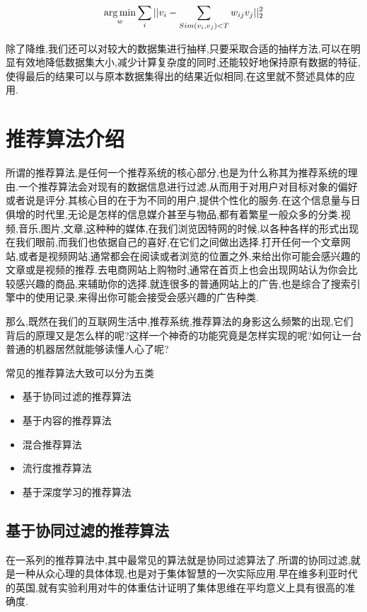 \begin{equation}
	\operatorname*{arg\,min}_{w} \sum_i ||v_i-\sum_{Sim(v_i,v_j)<T}w_{ij}v_j||^2_2
\end{equation}

除了降维,我们还可以对较大的数据集进行抽样,只要采取合适的抽样方法,可以在明显有效地降低数据集大小,减少计算复杂度的同时,还能较好地保持原有数据的特征,使得最后的结果可以与原本数据集得出的结果近似相同,在这里就不赘述具体的应用.

\section{推荐算法介绍}
\label{sec:recomm}

所谓的推荐算法,是任何一个推荐系统的核心部分,也是为什么称其为推荐系统的理由.一个推荐算法会对现有的数据信息进行过滤,从而用于对用户对目标对象的偏好或者说是评分.其核心目的在于为不同的用户,提供个性化的服务.在这个信息量与日俱增的时代里,无论是怎样的信息媒介甚至与物品,都有着繁星一般众多的分类.视频,音乐,图片,文章,这种种的媒体,在我们浏览因特网的时候,以各种各样的形式出现在我们眼前,而我们也依据自己的喜好,在它们之间做出选择.打开任何一个文章网站,或者是视频网站,通常都会在阅读或者浏览的位置之外,来给出你可能会感兴趣的文章或是视频的推荐.去电商网站上购物时,通常在首页上也会出现网站认为你会比较感兴趣的商品,来辅助你的选择.就连很多的普通网站上的广告,也是综合了搜索引擎中的使用记录,来得出你可能会接受会感兴趣的广告种类.

那么,既然在我们的互联网生活中,推荐系统,推荐算法的身影这么频繁的出现,它们背后的原理又是怎么样的呢?这样一个神奇的功能究竟是怎样实现的呢?如何让一台普通的机器居然就能够读懂人心了呢?

常见的推荐算法大致可以分为五类

\begin{itemize}
	\item
		基于协同过滤的推荐算法
	\item
		基于内容的推荐算法
	\item
		混合推荐算法
	\item
		流行度推荐算法
	\item
		基于深度学习的推荐算法
\end{itemize}


\subsection{基于协同过滤的推荐算法}

在一系列的推荐算法中,其中最常见的算法就是协同过滤算法了.所谓的协同过滤,就是一种从众心理的具体体现,也是对于集体智慧的一次实际应用.早在维多利亚时代的英国,就有实验利用对牛的体重估计证明了集体思维在平均意义上具有很高的准确度.

